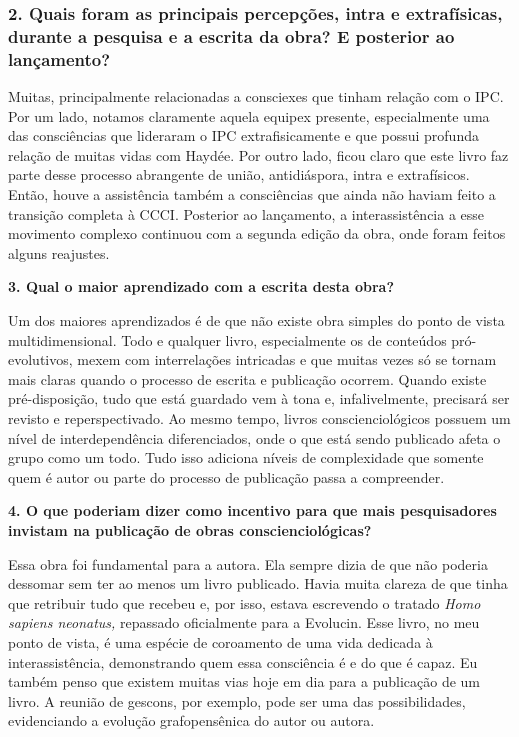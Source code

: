 \documentclass{gescons}
\begin{document}
\begin{multicols}{3}
\subsubsection{2. Quais foram as principais percepções, intra e extrafísicas, durante a pesquisa e a escrita da obra? E posterior ao lançamento?}


Muitas, principalmente relacionadas a consciexes que tinham relação com o IPC. Por um lado, notamos claramente aquela equipex presente, especialmente uma das consciências que lideraram o IPC extrafisicamente e que possui profunda relação de muitas vidas com Haydée. Por outro lado, ficou claro que este livro faz parte desse processo abrangente de união, antidiáspora, intra e extrafísicos. Então, houve a assistência também a consciências que ainda não haviam feito a transição completa à CCCI. Posterior ao lançamento, a interassistência a esse movimento complexo continuou com a segunda edição da obra, onde foram feitos alguns reajustes.


\textbf{3. Qual o maior aprendizado com a escrita desta obra?}

Um dos maiores aprendizados é de que não existe obra simples do ponto de vista multidimensional. Todo e qualquer livro, especialmente os de conteúdos pró-evolutivos, mexem com interrelações intricadas e que muitas vezes só se tornam mais claras quando o processo de escrita e publicação ocorrem. Quando existe pré-disposição, tudo que está guardado vem à tona e, infalivelmente, precisará ser revisto e reperspectivado. Ao mesmo tempo, livros conscienciológicos possuem um nível de interdependência diferenciados, onde o que está sendo publicado afeta o grupo como um todo. Tudo isso adiciona níveis de complexidade que somente quem é autor ou parte do processo de publicação passa a compreender.

\textbf{4. O que poderiam dizer como incentivo para que mais pesquisadores invistam na publicação de obras conscienciológicas?}

Essa obra foi fundamental para a autora. Ela sempre dizia de que não poderia dessomar sem ter ao menos um livro publicado. Havia muita clareza de que tinha que retribuir tudo que recebeu e, por isso, estava escrevendo o tratado \emph{Homo sapiens neonatus,} repassado oficialmente para a Evolucin. Esse livro, no meu ponto de vista, é uma espécie de coroamento de uma vida dedicada à interassistência, demonstrando quem essa consciência é e do que é capaz. Eu também penso que existem muitas vias hoje em dia para a publicação de um livro. A reunião de gescons, por exemplo, pode ser uma das possibilidades, evidenciando a evolução grafopensênica do autor ou autora.\\




    
    \end{multicols}
\end{document}
